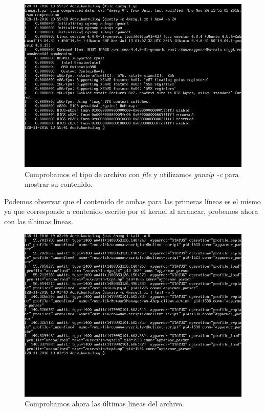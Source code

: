 \begin{figure}[H]
	\centering
	\includegraphics[scale=0.4]{dmesg1.png}
	\caption{Comprobamos el tipo de archivo con \textit{file\cite{c1b2}} y utilizamos \textit{gunzip -c\cite{c1b3}} para mostrar su contenido.}
\end{figure}

Podemos observar que el contenido de ambas para las primeras líneas es el mismo ya que corresponde a contenido escrito por el kernel al arrancar, probemos ahora con las últimas líneas.

\begin{figure}[H]
	\centering
	\includegraphics[scale=0.4]{dmesg2.png}
	\caption{Comprobamos ahora las últimas lineas del archivo.}
\end{figure}

